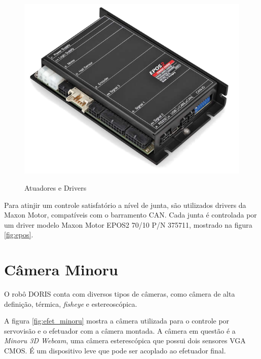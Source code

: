 \begin{figure}[htp]
{  \includegraphics[height=\twosubht]{./img/epos2-70-10.png}%
}
\caption{Atuadores e Drivers}
\end{figure}


Para atinjir um controle satisfatório a nível de junta, são utilizados drivers da Maxon Motor, compatíveis com o barramento CAN. Cada junta é controlada por um driver modelo Maxon Motor EPOS2 70/10 P/N 375711, mostrado na figura \ref{fig:epos}.

\section{Câmera Minoru} \label{sec:minoru}

O robô DORIS conta com diversos tipos de câmeras, como câmera de alta definição, térmica, \textit{fisheye} e estereoscópica. 

A figura \ref{fig:efet_minoru} mostra a câmera utilizada para o controle por servovisão e o efetuador com a câmera montada.
A câmera em questão é a \textit{Minoru 3D Webcam}, uma câmera esterescópica que possui dois sensores VGA CMOS. É um dispositivo leve que pode ser acoplado ao efetuador final.

